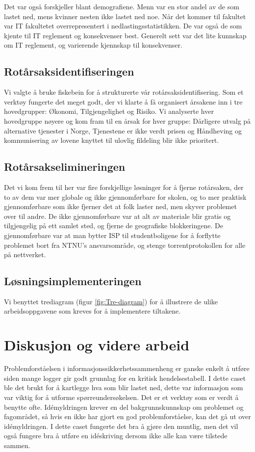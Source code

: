 Det var også forskjeller blant demografiene. Menn var en stor andel av de som lastet ned, mens kvinner nesten ikke lastet ned noe. Når det kommer til fakultet var IT fakultetet overrepresentert i nedlastingsstatistikken. De var også de som kjente til IT reglement og konsekvenser best. Generelt sett var det lite kunnskap om IT reglement, og varierende kjennskap til konsekvenser. 

\subsection{Rotårsaksidentifiseringen}
Vi valgte å bruke fiskebein for å strukturerte vår rotårsaksidentifisering. Som et verktøy fungerte det meget godt, der vi klarte å få organisert årsakene inn i tre hovedgrupper: Økonomi, Tilgjengelighet og Risiko. Vi analyserte hver hovedgruppe nøyere og kom fram til en årsak for hver gruppe: Dårligere utvalg på alternative tjenester i Norge, Tjenestene er ikke verdt prisen og Håndheving og kommunisering av lovene knyttet til ulovlig fildeling blir ikke prioritert. 

\subsection{Rotårsakselimineringen}
Det vi kom frem til her var fire forskjellige løsninger for å fjerne rotårsaken, der to av dem var mer globale og ikke gjennomførbare for skolen, og to mer praktisk gjennomførbare som ikke fjerner det at folk laster ned, men skyver problemet over til andre. De ikke gjennomførbare var at alt av materiale blir gratis og tilgjengelig på ett samlet sted, og fjerne de geografiske blokkeringene. De gjennomførbare var at man bytter ISP til studentboligene for å forflytte problemet bort fra NTNU's ansvarsområde, og stenge torrentprotokollen for alle på nettverket. 

\subsection{Løsningsimplementeringen}
Vi benyttet trediagram (figur \ref{fig:Tre-diagram}) for å illustrere de ulike arbeidsoppgavene som kreves for å implementere tiltakene.

\section{Diskusjon og videre arbeid}
Problemforståelsen i informasjonssikkerhetssammenheng er ganske enkelt å utføre siden mange logger gir godt grunnlag for en kritisk hendelsestabell. I dette caset ble det brukt for å kartlegge hva som blir lastet ned, dette var informasjon som var viktig for å utforme spørreundersøkelsen. Det er et verktøy som er verdt å benytte ofte. Idémyldringen krever en del bakgrunnskunnskap om problemet og fagområdet, så hvis en ikke har gjort en god problemforståelse, kan det gå ut over idémyldringen. I dette caset fungerte det bra å gjøre den muntlig, men det vil også fungere bra å utføre en idéskriving dersom ikke alle kan være tilstede sammen. 

